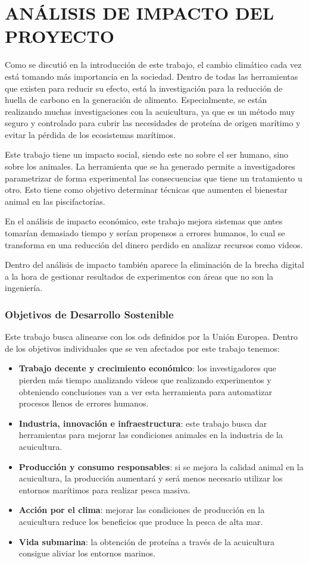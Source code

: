 \section{ANÁLISIS DE IMPACTO DEL PROYECTO}

Como se discutió en la introducción de este trabajo, el cambio climático cada vez está tomando más importancia en la sociedad. Dentro de todas las herramientas que existen para reducir su 
efecto, está la investigación para la reducción de huella de carbono en la generación de alimento. Especialmente, se están realizando muchas investigaciones con la acuicultura, ya que es un 
método muy seguro y controlado para cubrir las necesidades de proteína de origen marítimo y evitar la pérdida de los ecosistemas marítimos.

Este trabajo tiene un impacto social, siendo este no sobre el ser humano, sino sobre los animales. La herramienta que se ha generado permite a investigadores parametrizar de forma experimental 
las consecuencias que tiene un tratamiento u otro. Esto tiene como objetivo determinar técnicas que aumenten el bienestar animal en las piscifactorías.

En el análisis de impacto económico, este trabajo mejora sistemas que antes tomarían demasiado tiempo y serían propensos a errores humanos, lo cual se transforma en una reducción del dinero 
perdido en analizar recursos como videos.

Dentro del análisis de impacto también aparece la eliminación de la brecha digital a la hora de gestionar resultados de experimentos con áreas que no son la ingeniería.

\subsubsection*{Objetivos de Desarrollo Sostenible}

Este trabajo busca alinearse con los \acrshort{ods} definidos por la Unión Europea. Dentro de los objetivos individuales que se ven afectados por este trabajo tenemos:
\begin{itemize}
    \item \textbf{Trabajo decente y crecimiento económico}: los investigadores que pierden más tiempo analizando videos que realizando experimentos y obteniendo conclusiones van a ver esta herramienta 
    para automatizar procesos llenos de errores humanos.
    \item \textbf{Industria, innovación e infraestructura}: este trabajo busca dar herramientas para mejorar las condiciones animales en la industria de la acuicultura.
    \item \textbf{Producción y consumo responsables}: si se mejora la calidad animal en la acuicultura, la producción aumentará y será menos necesario utilizar los entornos marítimos para realizar pesca 
    masiva.
    \item \textbf{Acción por el clima}: mejorar las condiciones de producción en la acuicultura reduce los beneficios que produce la pesca de alta mar.
    \item \textbf{Vida submarina}: la obtención de proteína a través de la acuicultura consigue aliviar los entornos marinos.
\end{itemize}